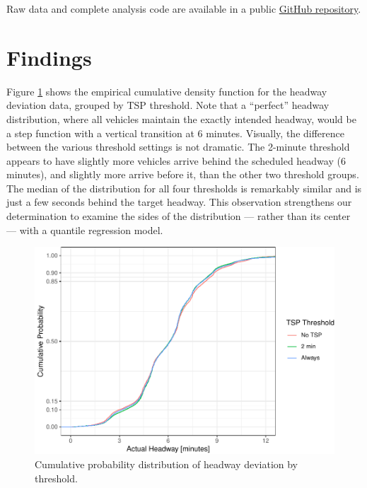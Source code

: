 \documentclass[3p, authoryear, review]{elsarticle} %
\begin{document}
Raw data and complete analysis code are available in a public
\href{https://github.com/byu-transpolab/uvx_headways}{GitHub repository}.

\hypertarget{findings}{%
\section{Findings}\label{findings}}

Figure \ref{fig:ecdf} shows the empirical cumulative density function for the
headway deviation data, grouped by TSP threshold. Note that a ``perfect''
headway distribution, where all vehicles maintain the exactly intended headway,
would be a step function with a vertical transition at 6 minutes.
Visually, the difference between the various threshold settings is not dramatic.
The 2-minute threshold appears to have slightly more vehicles arrive behind the
scheduled headway (6 minutes), and slightly more arrive before it, than the
other two threshold groups. The median of the distribution for all
four thresholds is remarkably similar and is just a few seconds behind the target
headway. This observation strengthens our determination to examine the sides of
the distribution --- rather than its center --- with a quantile regression model.

\begin{figure}
\centering
\includegraphics{uvx_headways_files/figure-latex/ecdf-1.pdf}
\caption{\label{fig:ecdf}Cumulative probability distribution of headway deviation by threshold.}
\end{figure}
\end{document}
